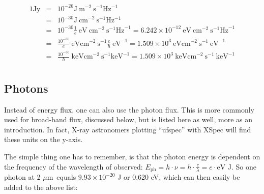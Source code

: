 \documentclass[12pt,a4paper]{article}
\newcommand{\micron}{\ensuremath{\mu \mathrm{m}}}
\newcommand{\jmsqshz}{\ensuremath{\mathrm{J}\ \mathrm{m}^{-2}\ \mathrm{s^{-1}} \mathrm{Hz^{-1}}}}
\newcommand{\jcmsqshz}{\ensuremath{\mathrm{J\ cm}^{-2}\ \mathrm{s^{-1}} \mathrm{Hz^{-1}}}}
\begin{document}
\begin{eqnarray*}
1 \mathrm{Jy} & = & 10^{-26} \jmsqshz \\
& = & 10^{-30} \jcmsqshz \\
& = & 10^{-30} \frac{1}{e}\ \mathrm{eV}\ \mathrm{cm}^{-2}\ \mathrm{s}^{-1} \mathrm{Hz}^{-1} = 6.242 \times 10^{-12}\ \mathrm{eV}\ \mathrm{cm}^{-2}\ \mathrm{s}^{-1} \mathrm{Hz}^{-1} \\
& = & \frac{10^{-30}}{e}\ \mathrm{eV} \mathrm{cm}^{-2}\ \mathrm{s}^{-1} \frac{e}{h}\ \mathrm{eV}^{-1} = 1.509 \times 10^{3}\ \mathrm{eV} \mathrm{cm}^{-2}\ \mathrm{s}^{-1}\ \mathrm{eV}^{-1} \\
& = & \frac{10^{-30}}{h}\ \mathrm{keV} \mathrm{cm}^{-2}\ \mathrm{s}^{-1} \mathrm{keV}^{-1} = 1.509 \times 10^{3}\ \mathrm{keV} \mathrm{cm}^{-2}\ \mathrm{s}^{-1}\ \mathrm{keV}^{-1} \\
\end{eqnarray*}


\subsection*{Photons}

Instead of energy flux, one can also use the photon flux. This is more commonly used for broad-band flux, discussed below, but is listed here as well, more as an introduction. In fact, X-ray astronomers plotting ``ufspec'' with XSpec will find these units on the y-axis.

The simple thing one has to remember, is that the photon energy is dependent on the frequency of the wavelength of observed: $E_{\mathrm{ph}} = h \cdot \nu = h \cdot \frac{c}{\lambda} = e \cdot \mathrm{eV}$ J. So one photon at 2 \micron\ equals $9.93 \times 10^{-20}$ J or 0.620 eV, which can then easily be added to the above list:
\end{document}
